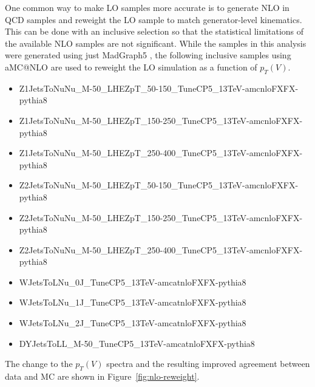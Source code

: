 One common way to make LO samples more accurate
is to generate NLO in QCD samples and reweight the LO sample
to match generator-level kinematics.
This can be done with an inclusive selection so that the statistical limitations
of the available NLO samples are not significant.
While the samples in this analysis were generated using just
MadGraph5 \cite{hirschi2015automated},
the following inclusive samples using aMC@NLO \cite{Alwall:2014hca}
are used to reweight the LO simulation as a function of $p_T(V)$.
\begin{itemize}
\item Z1JetsToNuNu\_M-50\_LHEZpT\_50-150\_TuneCP5\_13TeV-amcnloFXFX-pythia8
\item Z1JetsToNuNu\_M-50\_LHEZpT\_150-250\_TuneCP5\_13TeV-amcnloFXFX-pythia8
\item Z1JetsToNuNu\_M-50\_LHEZpT\_250-400\_TuneCP5\_13TeV-amcnloFXFX-pythia8
\item Z2JetsToNuNu\_M-50\_LHEZpT\_50-150\_TuneCP5\_13TeV-amcnloFXFX-pythia8
\item Z2JetsToNuNu\_M-50\_LHEZpT\_150-250\_TuneCP5\_13TeV-amcnloFXFX-pythia8
\item Z2JetsToNuNu\_M-50\_LHEZpT\_250-400\_TuneCP5\_13TeV-amcnloFXFX-pythia8
\item WJetsToLNu\_0J\_TuneCP5\_13TeV-amcatnloFXFX-pythia8
\item WJetsToLNu\_1J\_TuneCP5\_13TeV-amcatnloFXFX-pythia8
\item WJetsToLNu\_2J\_TuneCP5\_13TeV-amcatnloFXFX-pythia8
\item DYJetsToLL\_M-50\_TuneCP5\_13TeV-amcatnloFXFX-pythia8
\end{itemize}
The change to the $p_T(V)$ spectra and the resulting improved agreement between data and MC
are shown in Figure~\ref{fig:nlo-reweight}.
